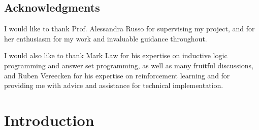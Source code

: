 \documentclass[11pt,twoside]{report}
\date{September 2018}
\theoremstyle{plain}
\theoremstyle{definition}
\let\listoftableandfigures\listoftables
\renewcommand*\listtablename{List of Tables and Figures}
\begin{document}


\clearpage{\pagestyle{empty}\cleardoublepage}
\setcounter{page}{1}
\pagestyle{fancy}


 \begin{abstract}

 \end{abstract}
\cleardoublepage
\section*{Acknowledgments}

I would like to thank Prof. Alessandra Russo for supervising my project, and for her enthusiasm for my work and invaluable guidance throughout.

I would also like to thank Mark Law for his expertise on inductive logic programming and answer set programming,  as well as many fruitful discussions, and  Ruben Vereecken for his expertise on reinforcement learning and for providing me with advice and assistance for technical implementation.

\clearpage{\pagestyle{empty}\cleardoublepage}

\tableofcontents

\clearpage{\pagestyle{empty}\cleardoublepage}
\setcounter{page}{1}
\fancyhead[LE,RO]{\slshape \rightmark}
\fancyhead[LO,RE]{\slshape \leftmark}

\renewcommand\listtablename{List of Figures and Tables}
\listoftableandfigures

 


\chapter{Introduction}
\label{introduction}

\end{document}
